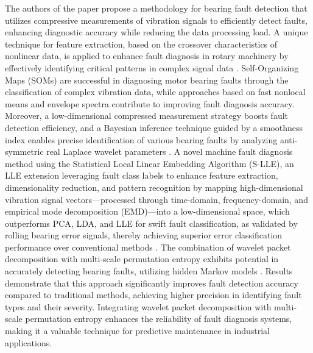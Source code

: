 \documentclass[sn-basic,pdflatex]{sn-jnl}
\theoremstyle{remark}
\theoremstyle{definition}
\begin{document}
The authors of the paper \citet{WOS:000335959500009} propose a
methodology for bearing fault detection that utilizes compressive
measurements of vibration signals to efficiently detect faults,
enhancing diagnostic accuracy while reducing the data processing load. A
unique technique for feature extraction, based on the crossover
characteristics of nonlinear data, is applied to enhance fault diagnosis
in rotary machinery by effectively identifying critical patterns in
complex signal data \citep{WOS:000338603900013}. Self-Organizing Maps
(SOMs) are successful in diagnosing motor bearing faults through the
classification of complex vibration data, while approaches based on fast
nonlocal means and envelope spectra contribute to improving fault
diagnosis accuracy. Moreover, a low-dimensional compressed measurement
strategy boosts fault detection efficiency, and a Bayesian inference
technique guided by a smoothness index enables precise identification of
various bearing faults by analyzing anti-symmetric real Laplace wavelet
parameters
\citep{WOS:000380543400119, WOS:000348309400067, WOS:000354607100016, WOS:000350998800016}.
A novel machine fault diagnosis method using the Statistical Local
Linear Embedding Algorithm (S-LLE), an LLE extension leveraging fault
class labels to enhance feature extraction, dimensionality reduction,
and pattern recognition by mapping high-dimensional vibration signal
vectors---processed through time-domain, frequency-domain, and empirical
mode decomposition (EMD)---into a low-dimensional space, which
outperforms PCA, LDA, and LLE for swift fault classification, as
validated by rolling bearing error signals, thereby achieving superior
error classification performance over conventional methods
\citep{WOS:000361788200068}. The combination of wavelet packet
decomposition with multi-scale permutation entropy exhibits potential in
accurately detecting bearing faults, utilizing hidden Markov models
\citep{WOS:000362513400031}. Results demonstrate that this approach
significantly improves fault detection accuracy compared to traditional
methods, achieving higher precision in identifying fault types and their
severity. Integrating wavelet packet decomposition with multi-scale
permutation entropy enhances the reliability of fault diagnosis systems,
making it a valuable technique for predictive maintenance in industrial
applications.
\end{document}
